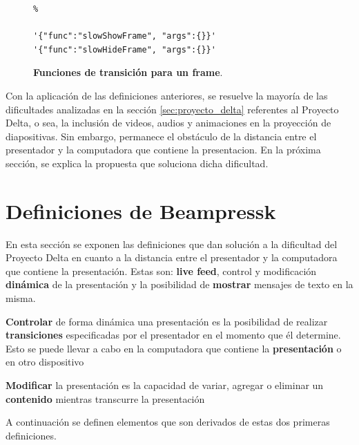 		\begin{figure}[htb]%
			\begin{lstlisting}%

'{"func":"slowShowFrame", "args":{}}'
'{"func":"slowHideFrame", "args":{}}'
			\end{lstlisting}
		\caption{
			\textbf{Funciones de transición para un frame}. 
			\label{fig:frame_trans} }
		\end{figure}	


		Con la aplicación de las definiciones anteriores, se resuelve la mayoría de las dificultades analizadas en la sección \ref{sec:proyecto_delta} referentes al Proyecto Delta, o sea, la inclusión de videos, audios y animaciones en la proyección de diapositivas. Sin embargo, permanece el obstáculo de la distancia entre el presentador y la computadora que contiene la presentacion. En la próxima sección, se explica la propuesta que soluciona dicha dificultad.

	\section{Definiciones de Beampressk} %
	\label{sec:definiciones_de_beampressk}

		En esta sección se exponen las definiciones que dan solución a la dificultad del Proyecto Delta en cuanto a la distancia entre el presentador y la computadora que contiene la presentación. Estas son: \textbf{live feed}, control y modificación \textbf{dinámica} de la presentación y la posibilidad de \textbf{mostrar} mensajes de texto en la misma.

	\begin{definition}
		\textbf{Controlar} de forma dinámica una presentación es la posibilidad de realizar \textbf{transiciones} especificadas por el presentador en el momento que él determine. Esto se puede llevar a cabo en la computadora que contiene la \textbf{presentación} o en otro dispositivo
	\end{definition}

	\begin{definition}
		\textbf{Modificar} la presentación es la capacidad de variar, agregar o eliminar un \textbf{contenido} mientras transcurre la presentación
	\end{definition}

	A continuación se definen elementos que son derivados de estas dos primeras definiciones.

